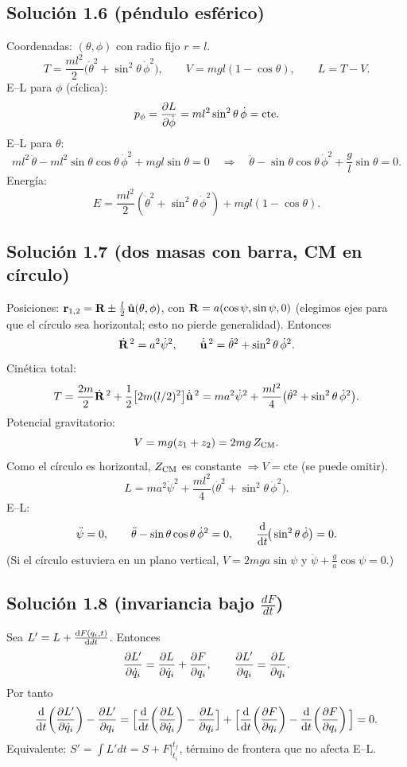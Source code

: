 \tableofcontents \newpage

\subsection*{Solución 1.6 (péndulo esférico)}
Coordenadas: $(\theta,\phi)$ con radio fijo $r=l$.
\[
T=\frac{m l^2}{2}\big(\dot\theta^2+\sin^2\theta\,\dot\phi^2\big),\qquad
V=mgl(1-\cos\theta),\qquad L=T-V.
\]
E–L para $\phi$ (cíclica):
\[
p_\phi=\pdv{L}{\dot\phi}=m l^2\sin^2\theta\,\dot\phi=\text{cte}.
\]
E–L para $\theta$:
\[
m l^2\,\ddot\theta - m l^2\sin\theta\cos\theta\,\dot\phi^2 + mgl\sin\theta=0
\quad\Rightarrow\quad
\ddot\theta-\sin\theta\cos\theta\,\dot\phi^2+\frac{g}{l}\sin\theta=0.
\]
Energía:
\[
E=\frac{m l^2}{2}(\dot\theta^2+\sin^2\theta\,\dot\phi^2)+mgl(1-\cos\theta).
\]

\subsection*{Solución 1.7 (dos masas con barra, CM en círculo)}
Posiciones: $\vb r_{1,2}=\vb R\pm \tfrac{l}{2}\,\hat{\vb u}(\theta,\phi)$,
con $\vb R=a(\cos\psi,\sin\psi,0)$ (elegimos ejes para que el círculo sea horizontal; esto no pierde generalidad).
Entonces
\[
\dot{\vb R}^{\,2}=a^2\dot\psi^2,\qquad
\dot{\hat{\vb u}}^{\,2}=\dot\theta^2+\sin^2\theta\,\dot\phi^2.
\]
Cinética total:
\[
T=\frac{2m}{2}\dot{\vb R}^{\,2}+\frac{1}{2}\big[2m(l/2)^2\big]\dot{\hat{\vb u}}^{\,2}
= m a^2\dot\psi^2+\frac{m l^2}{4}\big(\dot\theta^2+\sin^2\theta\,\dot\phi^2\big).
\]
Potencial gravitatorio:
\[
V=mg(z_1+z_2)=2mg\,Z_{\rm CM}.
\]
Como el círculo es horizontal, $Z_{\rm CM}$ es constante $\Rightarrow V=\text{cte}$ (se puede omitir).
\[
L= m a^2\dot\psi^2+\frac{m l^2}{4}\big(\dot\theta^2+\sin^2\theta\,\dot\phi^2\big).
\]
E–L:
\[
\ddot\psi=0,\qquad
\ddot\theta-\sin\theta\cos\theta\,\dot\phi^2=0,\qquad
\dv{t}\!\big(\sin^2\theta\,\dot\phi\big)=0.
\]
(Si el círculo estuviera en un plano vertical, $V=2mga\sin\psi$ y
$\ddot\psi+\frac{g}{a}\cos\psi=0$.)

\subsection*{Solución 1.8 (invariancia bajo $\frac{dF}{dt}$)}
Sea $L'=L+\dv{F(q_i,t)}{dt}$. Entonces
\[
\pdv{L'}{\dot q_i}=\pdv{L}{\dot q_i}+\pdv{F}{q_i},\qquad
\pdv{L'}{q_i}=\pdv{L}{q_i}.
\]
Por tanto
\[
\dv{t}\!\left(\pdv{L'}{\dot q_i}\right)-\pdv{L'}{q_i}
=\Big[\dv{t}\!\left(\pdv{L}{\dot q_i}\right)-\pdv{L}{q_i}\Big]
+\Big[\dv{t}\!\left(\pdv{F}{q_i}\right)-\dv{t}\!\left(\pdv{F}{q_i}\right)\Big]=0.
\]
Equivalente: $S'=\int L'dt=S+F|^{t_f}_{t_i}$, término de frontera que no afecta E–L.

